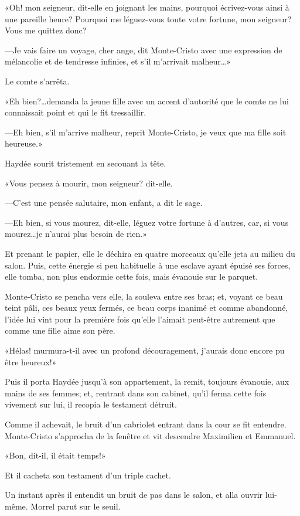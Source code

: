 «Oh! mon seigneur, dit-elle en joignant les mains, pourquoi écrivez-vous ainsi à une pareille heure? Pourquoi me léguez-vous toute votre fortune, mon seigneur? Vous me quittez donc? 

—Je vais faire un voyage, cher ange, dit Monte-Cristo avec une expression de mélancolie et de tendresse infinies, et s'il m'arrivait malheur\dots» 

Le comte s'arrêta. 

«Eh bien?\dots demanda la jeune fille avec un accent d'autorité que le comte ne lui connaissait point et qui le fit tressaillir. 

—Eh bien, s'il m'arrive malheur, reprit Monte-Cristo, je veux que ma fille soit heureuse.» 

Haydée sourit tristement en secouant la tête. 

«Vous pensez à mourir, mon seigneur? dit-elle. 

—C'est une pensée salutaire, mon enfant, a dit le sage. 

—Eh bien, si vous mourez, dit-elle, léguez votre fortune à d'autres, car, si vous mourez\dots je n'aurai plus besoin de rien.» 

Et prenant le papier, elle le déchira en quatre morceaux qu'elle jeta au milieu du salon. Puis, cette énergie si peu habituelle à une esclave ayant épuisé ses forces, elle tomba, non plus endormie cette fois, mais évanouie sur le parquet. 

Monte-Cristo se pencha vers elle, la souleva entre ses bras; et, voyant ce beau teint pâli, ces beaux yeux fermés, ce beau corps inanimé et comme abandonné, l'idée lui vint pour la première fois qu'elle l'aimait peut-être autrement que comme une fille aime son père. 

«Hélas! murmura-t-il avec un profond découragement, j'aurais donc encore pu être heureux!» 

Puis il porta Haydée jusqu'à son appartement, la remit, toujours évanouie, aux mains de ses femmes; et, rentrant dans son cabinet, qu'il ferma cette fois vivement sur lui, il recopia le testament détruit. 

Comme il achevait, le bruit d'un cabriolet entrant dans la cour se fit entendre. Monte-Cristo s'approcha de la fenêtre et vit descendre Maximilien et Emmanuel. 

«Bon, dit-il, il était temps!» 

Et il cacheta son testament d'un triple cachet. 

Un instant après il entendit un bruit de pas dans le salon, et alla ouvrir lui-même. Morrel parut sur le seuil. 

